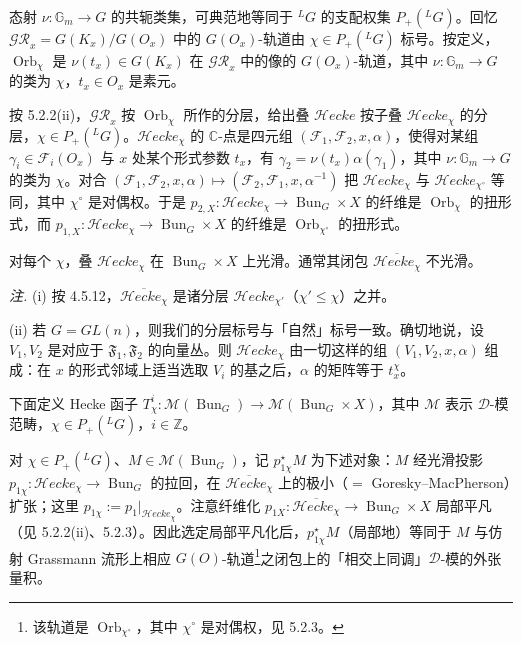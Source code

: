  态射 $\nu:\mathbb{G}_m\to G$ 的共轭类集，可典范地等同于 ${}^{L}G$ 的支配权集 $P_+({}^{L}G)$。回忆 $\mathcal{GR}_x=G(K_x)/G(O_x)$ 中的 $G(O_x)$-轨道由 $\chi\in P_+({}^{L}G)$ 标号。按定义，$\operatorname{Orb}_\chi$ 是 $\nu(t_x)\in G(K_x)$ 在 $\mathcal{GR}_x$ 中的像的 $G(O_x)$-轨道，其中 $\nu:\mathbb{G}_m\to G$ 的类为 $\chi$，$t_x\in O_x$ 是素元。


按 5.2.2(ii)，$\mathcal{GR}_x$ 按 $\operatorname{Orb}_\chi$ 所作的分层，给出叠 $\mathcal{H}ecke$ 按子叠 $\mathcal{H}ecke_\chi$ 的分层，$\chi\in P_+({}^{L}G)$。$\mathcal{H}ecke_\chi$ 的 $\mathbb{C}$-点是四元组 $(\mathcal{F}_1,\mathcal{F}_2,x,\alpha)$，使得对某组 $\gamma_i\in\mathcal{F}_i(O_x)$ 与 $x$ 处某个形式参数 $t_x$，有 $\gamma_2=\nu(t_x)\alpha(\gamma_1)$，其中 $\nu:\mathbb{G}_m\to G$ 的类为 $\chi$。对合 $(\mathcal{F}_1,\mathcal{F}_2,x,\alpha)\mapsto(\mathcal{F}_2,\mathcal{F}_1,x,\alpha^{-1})$ 把 $\mathcal{H}ecke_\chi$ 与 $\mathcal{H}ecke_{\chi^\circ}$ 等同，其中 $\chi^\circ$ 是对偶权。于是 $p_{2,X}:\mathcal{H}ecke_\chi\to\operatorname{Bun}_G\times X$ 的纤维是 $\operatorname{Orb}_\chi$ 的扭形式，而 $p_{1,X}:\mathcal{H}ecke_\chi\to\operatorname{Bun}_G\times X$ 的纤维是 $\operatorname{Orb}_{\chi^\circ}$ 的扭形式。

对每个 $\chi$，叠 $\mathcal{H}ecke_\chi$ 在 $\operatorname{Bun}_G\times X$ 上光滑。通常其闭包 $\overline{\mathcal{H}ecke_\chi}$ 不光滑。

\emph{注.} (i) 按 4.5.12，$\overline{\mathcal{H}ecke_\chi}$ 是诸分层 $\mathcal{H}ecke_{\chi'}$（$\chi'\le\chi$）之并。

(ii) 若 $G=GL(n)$，则我们的分层标号与「自然」标号一致。确切地说，设 $V_1,V_2$ 是对应于 $\mathfrak{F}_1,\mathfrak{F}_2$ 的向量丛。则 $\mathcal{H}ecke_\chi$ 由一切这样的组 $(V_1,V_2,x,\alpha)$ 组成：在 $x$ 的形式邻域上适当选取 $V_i$ 的基之后，$\alpha$ 的矩阵等于 $t_x^\chi$。

 下面定义 Hecke 函子 $T_\chi^i:\mathcal{M}(\operatorname{Bun}_G)\to\mathcal{M}(\operatorname{Bun}_G\times X)$，其中 $\mathcal{M}$ 表示 $\mathcal{D}$-模范畴，$\chi\in P_+({}^{L}G)$，$i\in\mathbb{Z}$。

对 $\chi\in P_+({}^{L}G)$、$M\in\mathcal{M}(\operatorname{Bun}_G)$，记 $p_{1\chi}^\star M$ 为下述对象：$M$ 经光滑投影 $p_{1\chi}:\mathcal{H}ecke_\chi\to\operatorname{Bun}_G$ 的拉回，在 $\overline{\mathcal{H}ecke_\chi}$ 上的极小（$=$ Goresky--MacPherson）扩张；这里 $p_{1\chi}:=p_1|_{\mathcal{H}ecke_\chi}$。注意纤维化 $p_{1X}:\overline{\mathcal{H}ecke_\chi}\to\operatorname{Bun}_G\times X$ 局部平凡（见 5.2.2(ii)、5.2.3）。因此选定局部平凡化后，$p_{1\chi}^\star M$（局部地）等同于 $M$ 与仿射 Grassmann 流形上相应 $G(O)$-轨道\footnote{该轨道是 $\operatorname{Orb}_{\chi^\circ}$，其中 $\chi^\circ$ 是对偶权，见 5.2.3。}之闭包上的「相交上同调」$\mathcal{D}$-模的外张量积。

